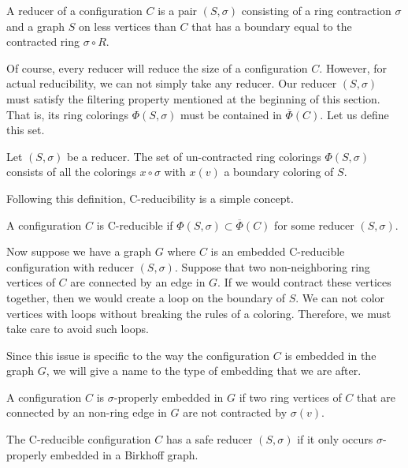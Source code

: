 \begin{definition}
    A reducer of a configuration $C$ is a pair $(S, \sigma)$  consisting of a ring contraction $\sigma$ and a graph $S$ on less vertices than $C$ that has a boundary equal to the contracted ring $\sigma \circ R$.
\end{definition}

Of course, every reducer will reduce the size of a configuration $C$. However, for actual reducibility, we can not simply take any reducer. Our reducer $(S, \sigma)$ must satisfy the filtering property mentioned at the beginning of this section. That is, its ring colorings $\Phi(S, \sigma)$ must be contained in $\overline{\Phi}(C)$. Let us define this set.

\begin{definition}
    Let $(S, \sigma)$ be a reducer. The set of un-contracted ring colorings $\Phi(S, \sigma)$ consists of all the colorings $x \circ \sigma$ with $x(v)$ a boundary coloring of $S$.
\end{definition}

Following this definition, C-reducibility is a simple concept.

\begin{definition}
    A configuration $C$ is C-reducible if $\Phi(S,\sigma) \subset \overline{\Phi}(C)$ for some reducer $(S,\sigma)$.
\end{definition}

Now suppose we have a graph $G$ where $C$ is an embedded C-reducible configuration with reducer $(S,\sigma)$. Suppose that two non-neighboring ring vertices of $C$ are connected by an edge in $G$. If we would contract these vertices together, then we would create a loop on the boundary of $S$. We can not color vertices with loops without breaking the rules of a coloring. Therefore, we must take care to avoid such loops.

Since this issue is specific to the way the configuration $C$ is embedded in the graph $G$, we will give a name to the type of embedding that we are after.

\begin{definition}
    A configuration $C$ is $\sigma$-properly embedded in $G$ if two ring vertices of $C$ that are connected by an non-ring edge in $G$ are not contracted by $\sigma(v)$.
\end{definition}

\begin{definition}
    The C-reducible configuration $C$ has a safe reducer  $(S,\sigma)$ if it only occurs $\sigma$-properly embedded in a Birkhoff graph.
\end{definition}

